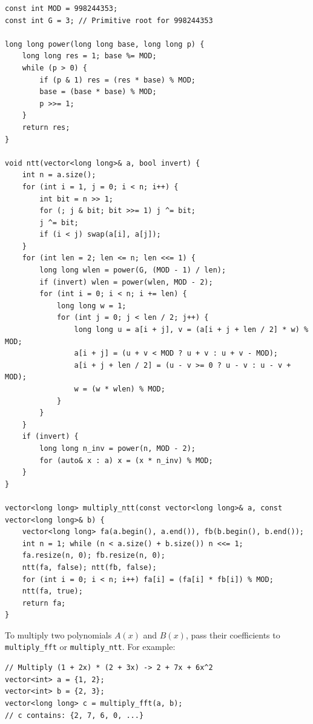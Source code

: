 \begin{lstlisting}
const int MOD = 998244353;
const int G = 3; // Primitive root for 998244353

long long power(long long base, long long p) {
    long long res = 1; base %= MOD;
    while (p > 0) {
        if (p & 1) res = (res * base) % MOD;
        base = (base * base) % MOD;
        p >>= 1;
    }
    return res;
}

void ntt(vector<long long>& a, bool invert) {
    int n = a.size();
    for (int i = 1, j = 0; i < n; i++) {
        int bit = n >> 1;
        for (; j & bit; bit >>= 1) j ^= bit;
        j ^= bit;
        if (i < j) swap(a[i], a[j]);
    }
    for (int len = 2; len <= n; len <<= 1) {
        long long wlen = power(G, (MOD - 1) / len);
        if (invert) wlen = power(wlen, MOD - 2);
        for (int i = 0; i < n; i += len) {
            long long w = 1;
            for (int j = 0; j < len / 2; j++) {
                long long u = a[i + j], v = (a[i + j + len / 2] * w) % MOD;
                a[i + j] = (u + v < MOD ? u + v : u + v - MOD);
                a[i + j + len / 2] = (u - v >= 0 ? u - v : u - v + MOD);
                w = (w * wlen) % MOD;
            }
        }
    }
    if (invert) {
        long long n_inv = power(n, MOD - 2);
        for (auto& x : a) x = (x * n_inv) % MOD;
    }
}

vector<long long> multiply_ntt(const vector<long long>& a, const vector<long long>& b) {
    vector<long long> fa(a.begin(), a.end()), fb(b.begin(), b.end());
    int n = 1; while (n < a.size() + b.size()) n <<= 1;
    fa.resize(n, 0); fb.resize(n, 0);
    ntt(fa, false); ntt(fb, false);
    for (int i = 0; i < n; i++) fa[i] = (fa[i] * fb[i]) % MOD;
    ntt(fa, true);
    return fa;
}
\end{lstlisting}

To multiply two polynomials $A(x)$ and $B(x)$, pass their coefficients to \lstinline|multiply_fft| or \lstinline|multiply_ntt|. For example:
\begin{lstlisting}
// Multiply (1 + 2x) * (2 + 3x) -> 2 + 7x + 6x^2
vector<int> a = {1, 2};
vector<int> b = {2, 3};
vector<long long> c = multiply_fft(a, b);
// c contains: {2, 7, 6, 0, ...}
\end{lstlisting}
